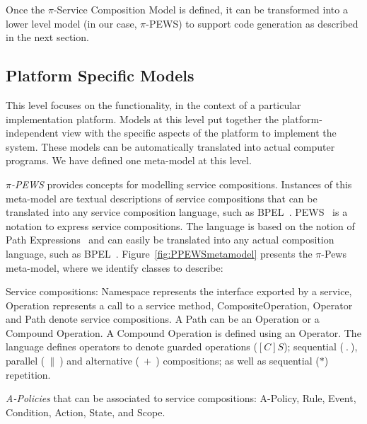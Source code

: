 \documentclass{singlecol-new}
\theoremstyle{TH}{
\newtheorem{lemma}{Lemma}
\newtheorem{theorem}[lemma]{Theorem}
\newtheorem{corrolary}[lemma]{Corrolary}
\newtheorem{conjecture}[lemma]{Conjecture}
\newtheorem{proposition}[lemma]{Proposition}
\newtheorem{claim}[lemma]{Claim}
\newtheorem{stheorem}[lemma]{Wrong Theorem}
\newtheorem{algorithm}{Algorithm}
}
\theoremstyle{THrm}{
\newtheorem{definition}{Definition}[section]
\newtheorem{question}{Question}[section]
\newtheorem{remark}{Remark}
\newtheorem{scheme}{Scheme}
}
\theoremstyle{THhit}{
\newtheorem{case}{Case}[section]
}
\theoremstyle{THhsl}{
\newtheorem{example}{Example}
}
\begin{document}
Once the $\pi$-Service Composition Model is defined,  it can be transformed into a lower level model (in our case, $\pi$-PEWS) to support code generation as described in the next section.


\subsection{Platform Specific Models}

This level focuses on the functionality, in the context of a particular implementation platform.
Models at this level put together the platform-independent view with the specific aspects of the platform to implement the system.
These models  can be automatically translated into actual computer programs.
We have defined one meta-model at this level.

\textit{$\pi$-PEWS} provides con\-cepts for modelling service compositions.
Instances of this meta-model are textual descriptions of service compositions that can be translated into any service composition language, such as BPEL~\cite{bpel03,ws-bpel2}.%
%
PEWS~\cite{BHM06}%
 is a notation to express service compositions.
The language is based on the notion of Path Expressions~\cite{And79} and can easily be translated into any actual composition language, such as BPEL~\cite{bpel03}.
Figure~\ref{fig:PPEWSmetamodel} presents the $\pi$-{\sc Pews} meta-model, where we identify classes to describe:

\begin{compactitem}
\item Service compositions: {\sc Namespace} represents the interface exported by a service, {\sc Operation} represents a call to a service method, {\sc CompositeOperation}, {\sc Operator} and {\sc Path}  denote service compositions.
A {\sc Path} can be an {\sc Operation} or a {\sc Compound Operation}.
A {\sc Compound Operation} is defined using an {\sc Operator}.
The language defines operators to denote guarded operations ($[C]S$); sequential ($\ . \ $), parallel ($\ \| \ $) and alternative ($\ + \ $) compositions; as well as sequential ($*$) repetition.
\item {\em A-Policies} that can be associated to service compositions:  {\sc A-Policy}, {\sc Rule}, {\sc Event}, {\sc Condition}, {\sc Action}, {\sc State}, and {\sc Scope}.
\end{compactitem}
\end{document}
